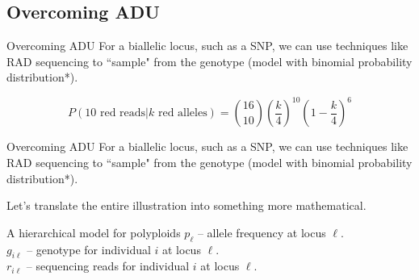 \documentclass[presentation,serif]{beamer}
\begin{document}
\subsection{Overcoming ADU}

\begin{frame}[t]{Overcoming ADU}
	For a biallelic locus, such as a SNP, we can use techniques like RAD sequencing to ``sample" from the genotype (model with binomial probability distribution*).
	\vspace{0.2in}

	\begin{center}
	\end{center}

	\pause
	\begin{equation*}
	P(10 \text{ red reads}|k \text{ red alleles}) = \binom{16}{10}\left(\frac{k}{4}\right)^{10}\left(1-\frac{k}{4}\right)^6
	\end{equation*}

\end{frame}

\begin{frame}[t]{Overcoming ADU}
	For a biallelic locus, such as a SNP, we can use techniques like RAD sequencing to ``sample" from the genotype (model with binomial probability distribution*).
	\vspace{0.2in}

	\begin{center}
	\end{center}

	\vspace{0.1in}
	Let's translate the entire illustration into something more mathematical.
\end{frame}

\begin{frame}[c]{A hierarchical model for polyploids}
	$p_{\ell}$ -- allele frequency at locus $\ell$. \\
	$g_{i \ell}$ -- genotype for individual $i$ at locus $\ell$. \\
	$r_{i \ell}$ -- sequencing reads for individual $i$ at locus $\ell$.
	\vspace{0.1in}
	\begin{center}
	\end{center}
\end{frame}
\end{document}
